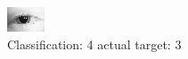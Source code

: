 \begin{figure}[h!]
\begin{center}
\includegraphics[width=0.60\columnwidth]{figures/ID80_class_4_target_3.png}
\end{center}
\caption{ Classification: 4 actual target: 3}
\label{fig:ID80_class_4_target_3}
\end{figure}
